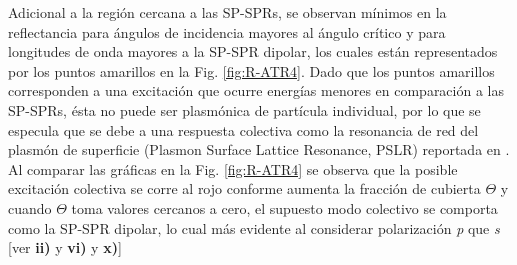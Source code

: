 Adicional a la región cercana a las SP-SPRs, se observan mínimos en la reflectancia para ángulos de incidencia mayores al ángulo crítico y para longitudes de onda mayores a la SP-SPR dipolar, los cuales están  representados por los puntos amarillos en la Fig. \ref{fig:R-ATR4}. Dado que los puntos amarillos corresponden a una excitación que ocurre energías  menores en comparación a las SP-SPRs, ésta no puede ser plasmónica de partícula individual,  por lo que se especula que se debe a una respuesta colectiva como la resonancia de red del plasmón de superficie (Plasmon Surface Lattice Resonance, PSLR) reportada en \cite{danilov2018ultra}. Al comparar las gráficas en la  Fig.  \ref{fig:R-ATR4} se observa que la posible excitación colectiva se corre al rojo  conforme aumenta la fracción de cubierta $\Theta$ y cuando $\Theta$ toma valores cercanos a cero, el supuesto modo colectivo se comporta como la SP-SPR dipolar, lo cual más evidente al considerar polarización \emph{p} que \emph{s} [ver \textbf{ii)} y \textbf{vi)} y \textbf{x)}]


